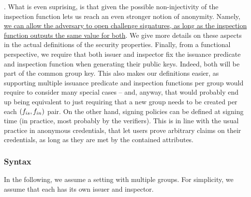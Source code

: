 \Inspect. What is even suprising, is that given the possible non-injectivity of
the inspection function lets us reach an even stronger notion of anonymity.
Namely, \uline{we can allow the adversary to open challenge signatures, as
  long as the inspection function outputs the same value for both}. We give more
details on these aspects in the actual definitions of the security properties.
%
Finally, from a functional perspective, we require that both issuer and
inspector fix the issuance predicate \fissue and inspection function \finsp when
generating their public keys. Indeed, both will be part of the common group key.
This also makes our definitions easier, as supporting multiple issuance
predicate and inspection functions per group would require to consider many
special cases -- and, anyway, that would probably end up being equivalent to
just requiring that a new group needs to be created per each $(f_{is},f_{in})$
pair. On the other hand, signing policies can be defined at signing time (in
practice, most probably by the verifiers). This is in line with the usual
practice in anonymous credentials, that let users prove arbitrary claims on
their credentials, as long as they are met by the contained attributes.

\subsubsection{Syntax}
\label{sssec:syntax}

In the following, we assume a setting with multiple groups. For simplicity,
we assume that each has its own issuer and inspector.



